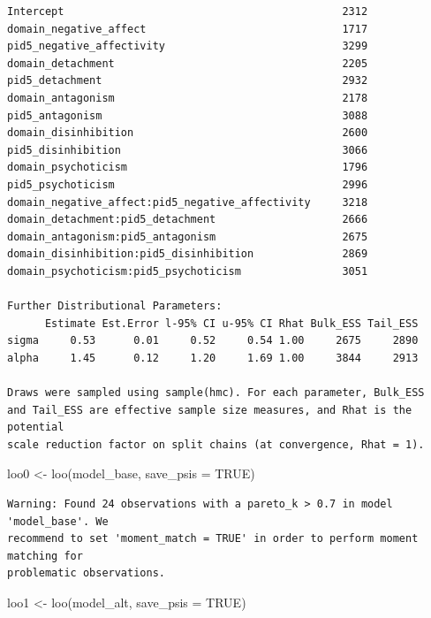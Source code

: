 \documentclass[
  11pt,
  a4paper,
  onecolumn]{article}
\newenvironment{Shaded}{}{}
\newcommand{\AttributeTok}[1]{\textcolor[rgb]{0.84,0.23,0.29}{#1}}
\newcommand{\ConstantTok}[1]{\textcolor[rgb]{0.00,0.36,0.77}{#1}}
\newcommand{\FunctionTok}[1]{\textcolor[rgb]{0.44,0.26,0.76}{#1}}
\newcommand{\NormalTok}[1]{\textcolor[rgb]{0.14,0.16,0.18}{#1}}
\newcommand{\OtherTok}[1]{\textcolor[rgb]{0.44,0.26,0.76}{#1}}
\begin{document}
\begin{verbatim}
Intercept                                            2312
domain_negative_affect                               1717
pid5_negative_affectivity                            3299
domain_detachment                                    2205
pid5_detachment                                      2932
domain_antagonism                                    2178
pid5_antagonism                                      3088
domain_disinhibition                                 2600
pid5_disinhibition                                   3066
domain_psychoticism                                  1796
pid5_psychoticism                                    2996
domain_negative_affect:pid5_negative_affectivity     3218
domain_detachment:pid5_detachment                    2666
domain_antagonism:pid5_antagonism                    2675
domain_disinhibition:pid5_disinhibition              2869
domain_psychoticism:pid5_psychoticism                3051

Further Distributional Parameters:
      Estimate Est.Error l-95% CI u-95% CI Rhat Bulk_ESS Tail_ESS
sigma     0.53      0.01     0.52     0.54 1.00     2675     2890
alpha     1.45      0.12     1.20     1.69 1.00     3844     2913

Draws were sampled using sample(hmc). For each parameter, Bulk_ESS
and Tail_ESS are effective sample size measures, and Rhat is the potential
scale reduction factor on split chains (at convergence, Rhat = 1).
\end{verbatim}

\begin{Shaded}
\begin{Highlighting}[]
\NormalTok{loo0 }\OtherTok{\textless{}{-}} \FunctionTok{loo}\NormalTok{(model\_base, }\AttributeTok{save\_psis =} \ConstantTok{TRUE}\NormalTok{)}
\end{Highlighting}
\end{Shaded}

\begin{verbatim}
Warning: Found 24 observations with a pareto_k > 0.7 in model 'model_base'. We
recommend to set 'moment_match = TRUE' in order to perform moment matching for
problematic observations.
\end{verbatim}

\begin{Shaded}
\begin{Highlighting}[]
\NormalTok{loo1 }\OtherTok{\textless{}{-}} \FunctionTok{loo}\NormalTok{(model\_alt, }\AttributeTok{save\_psis =} \ConstantTok{TRUE}\NormalTok{)}
\end{Highlighting}
\end{Shaded}
\end{document}
